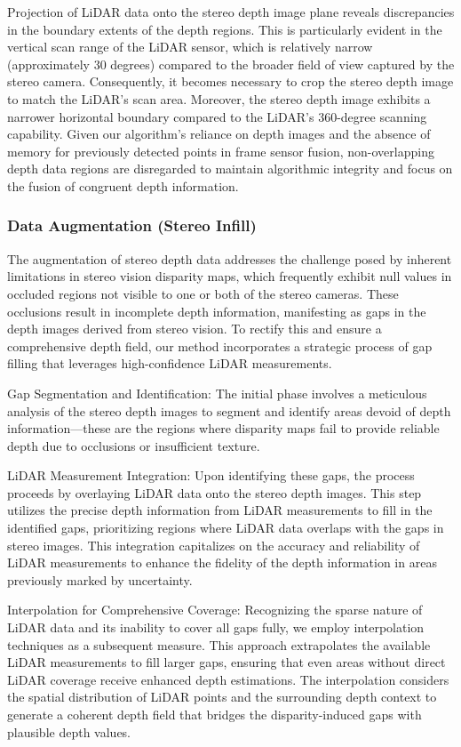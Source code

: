 \documentclass[conference]{IEEEtran}
\begin{document}
Projection of LiDAR data onto the stereo depth image plane reveals discrepancies in the boundary extents of the depth regions. This is particularly evident in the vertical scan range of the LiDAR sensor, which is relatively narrow (approximately 30 degrees) compared to the broader field of view captured by the stereo camera. Consequently, it becomes necessary to crop the stereo depth image to match the LiDAR's scan area. Moreover, the stereo depth image exhibits a narrower horizontal boundary compared to the LiDAR's 360-degree scanning capability. Given our algorithm's reliance on depth images and the absence of memory for previously detected points in frame sensor fusion, non-overlapping depth data regions are disregarded to maintain algorithmic integrity and focus on the fusion of congruent depth information.

\subsubsection{Data Augmentation (Stereo Infill)}

The augmentation of stereo depth data addresses the challenge posed by inherent limitations in stereo vision disparity maps, which frequently exhibit null values in occluded regions not visible to one or both of the stereo cameras. These occlusions result in incomplete depth information, manifesting as gaps in the depth images derived from stereo vision. To rectify this and ensure a comprehensive depth field, our method incorporates a strategic process of gap filling that leverages high-confidence LiDAR measurements.

Gap Segmentation and Identification: The initial phase involves a meticulous analysis of the stereo depth images to segment and identify areas devoid of depth information—these are the regions where disparity maps fail to provide reliable depth due to occlusions or insufficient texture.

LiDAR Measurement Integration: Upon identifying these gaps, the process proceeds by overlaying LiDAR data onto the stereo depth images. This step utilizes the precise depth information from LiDAR measurements to fill in the identified gaps, prioritizing regions where LiDAR data overlaps with the gaps in stereo images. This integration capitalizes on the accuracy and reliability of LiDAR measurements to enhance the fidelity of the depth information in areas previously marked by uncertainty.

Interpolation for Comprehensive Coverage: Recognizing the sparse nature of LiDAR data and its inability to cover all gaps fully, we employ interpolation techniques as a subsequent measure. This approach extrapolates the available LiDAR measurements to fill larger gaps, ensuring that even areas without direct LiDAR coverage receive enhanced depth estimations. The interpolation considers the spatial distribution of LiDAR points and the surrounding depth context to generate a coherent depth field that bridges the disparity-induced gaps with plausible depth values.
\end{document}

